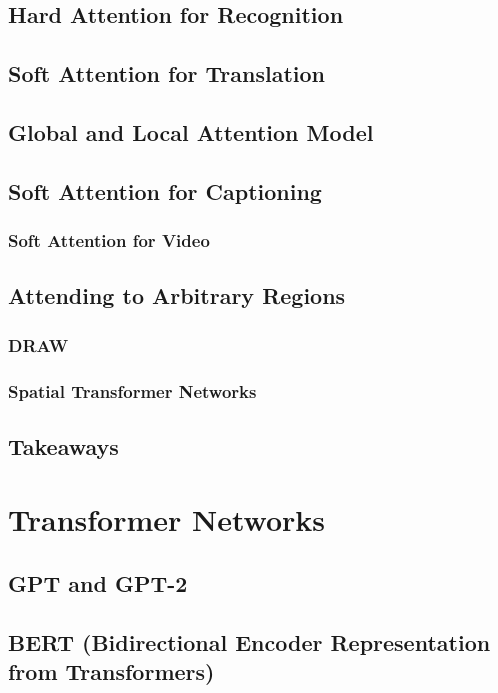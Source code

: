 		\subsection{Hard Attention for Recognition} %

		\subsection{Soft Attention for Translation} %

		\subsection{Global and Local Attention Model} %

		\subsection{Soft Attention for Captioning} %

			\subsubsection{Soft Attention for Video} %

		\subsection{Attending to Arbitrary Regions} %

			\subsubsection{DRAW} %

			\subsubsection{Spatial Transformer Networks} %

		\subsection{Takeaways} %

	\section{Transformer Networks} %

		\subsection{GPT and GPT-2} %

		\subsection{BERT (Bidirectional Encoder Representation from Transformers)} %
